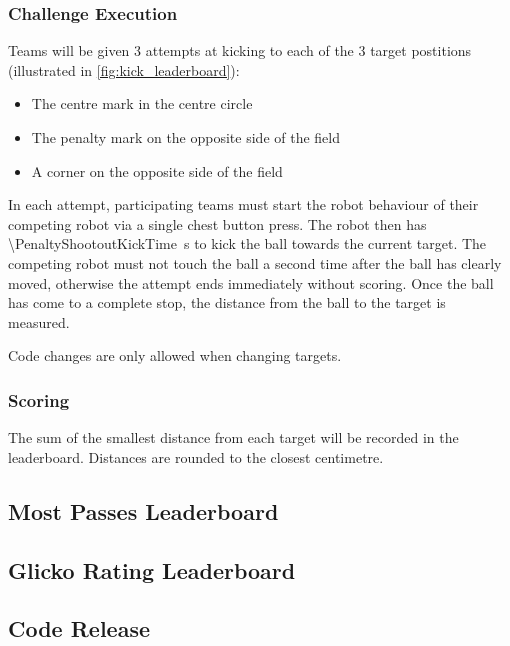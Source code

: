 \subsubsection{Challenge Execution}
Teams will be given 3 attempts at kicking to each of the 3 target postitions (illustrated in \cref{fig:kick_leaderboard}):
\begin{itemize}
    \item The centre mark in the centre circle
    \item The penalty mark on the opposite side of the field
    \item A corner on the opposite side of the field
\end{itemize}
In each attempt, participating teams must start the robot behaviour of their competing robot via a single chest button
press. The robot then has \qty{\PenaltyShootoutKickTime}{\second} to kick the ball towards the current target.
The competing robot must not touch the ball a second time after the ball has clearly moved,
otherwise the attempt ends immediately without scoring.
Once the ball has come to a complete stop, the distance from the ball to the target is measured.

Code changes are only allowed when changing targets.
\subsubsection{Scoring}
The sum of the smallest distance from each target will be recorded in the leaderboard.
Distances are rounded to the closest centimetre.

\subsection{Most Passes Leaderboard}

\subsection{Glicko Rating Leaderboard}

\subsection{Code Release}

